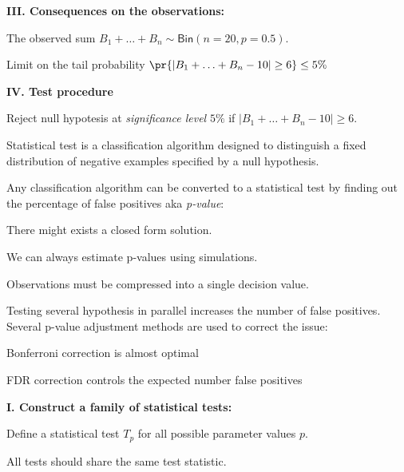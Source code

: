 \documentclass[landscape,footrule]{foils}
\begin{document}
\textbf{III. Consequences on the observations:} 
\begin{triangles}
\item The observed sum $B_1+\ldots+B_n\sim\mathsf{Bin}(n=20, p=0.5)$.
\item Limit on the tail probability $\pr{|B_1+\ldots+B_n-10|\geq 6}\leq 5\%$
\end{triangles}
\vspace*{1cm}

\textbf{IV. Test procedure}
\begin{triangles}
\item Reject null hypotesis at \emph{significance level} $5\%$ if $|B_1+\ldots+B_n-10|\geq 6$.  
\end{triangles}
 

Statistical test is a classification algorithm designed to distinguish a fixed distribution of negative examples specified by a null hypothesis.
\vspace*{2ex}

Any classification algorithm can be converted to a statistical test by finding out the percentage of false positives aka \emph{p-value}:
\begin{triangles}
\item There might exists a closed form solution.
\item We can always estimate p-values using simulations. 
\item Observations must be compressed into a single decision value.
\end{triangles}
\vspace*{2ex}

Testing several hypothesis in parallel increases the number of false positives.  
Several p-value adjustment methods are used to correct the issue:
\begin{triangles}
\item Bonferroni correction is almost optimal 
\item FDR correction controls the expected number false positives  
\end{triangles}  
 

 
\textbf{I. Construct a family of statistical tests:}
\begin{triangles}
\item Define a statistical test $T_p$ for all possible parameter values $p$.
\item All tests should share the same test statistic.
\end{triangles}
\vspace*{1cm}
\end{document}
